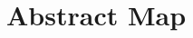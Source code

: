 \documentclass[a4paper]{article}
\begin{document}
\newcommand{\poset}{\raisebox{.15\baselineskip}{\Large\ensuremath{\wp}}}
\newcommand{\AObj}{\widehat{\textbf{Object}}}
\newcommand{\ADesc}{\widehat{\textbf{Descriptor}}}
\newcommand{\AMap}{\widehat{\textbf{Map}}}
\newcommand{\AKey}{\widehat{\textbf{Key}}}
\newcommand{\AVal}{\widehat{\textbf{Value}}}
\newcommand{\CObj}{\textbf{Object}}
\newcommand{\CDesc}{\textbf{Descriptor}}
\newcommand{\CMap}{\CKey \rightarrowtail \CVal}
\newcommand{\CKey}{\textbf{Key}}
\newcommand{\CVal}{\textbf{Value}}
\newcommand{\wsf}[1]{\widehat{\textsf{#1}}}
\newcommand{\wbf}[1]{\widehat{\textbf{#1}}}
\newcommand{\bsf}[1]{\textsf{\textbf{#1}}}
\newcommand{\Map}{\bsf{map}}
\newcommand{\Defset}{\bsf{defset}}
\newcommand{\Dom}{\bsf{dom}}
\newcommand{\po}{\sqsubseteq}

\renewcommand\arraystretch{1.2}

\section{Abstract Map}


\end{document}
